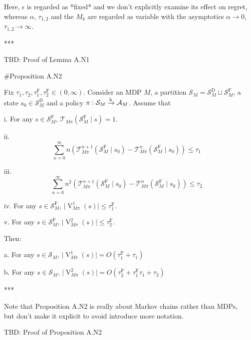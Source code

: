 \documentclass[a4paper]{article}
\newcommand{\AP}[1]{\left(#1\right)}
\newcommand{\Abs}[1]{\lvert #1 \rvert}
\newcommand{\M}{\xrightarrow{\textnormal{k}}}
\newcommand{\A}{\mathcal{A}}
\newcommand{\St}{\mathcal{S}}
\newcommand{\T}{\mathcal{T}}
\newcommand{\SF}{\St^{\text{F}}}
\newcommand{\SD}{\St^{\text{D}}}
\newcommand{\TF}{\tau^{\text{F}}}
\newcommand{\V}{\operatorname{V}}
\begin{document}
Here, $\epsilon$ is regarded as *fixed* and we don't explicitly examine its effect on regret, whereas $\alpha$, $\tau_{1,2}$ and the $M_k$ are regarded as variable with the asymptotics $\alpha \rightarrow 0$, $\tau_{1,2} \rightarrow \infty$.

***

TBD: Proof of Lemma A.N1

\#Proposition A.N2

Fix $\tau_1, \tau_2, \TF_1, \TF_2 \in (0,\infty)$. Consider an MDP $M$, a partition $\St_M = \SD_M \sqcup \SF_M$, a state $s_0 \in \SD_M$ and a policy $\pi: \St_M \M \A_M$. Assume that

i. For any $s \in \SF_M$, $\T_{M\pi}\AP{\SF_M \mid s}=1$.

ii. $$\sum_{n=0}^\infty n \AP{\T_{M\pi}^{n+1}\AP{\SF_M \mid s_0}-\T_{M\pi}^{n}\AP{\SF_M \mid s_0}} \leq \tau_1$$

iii. $$\sum_{n=0}^\infty n^2 \AP{\T_{M\pi}^{n+1}\AP{\SF_M \mid s_0}-\T_{M\pi}^{n}\AP{\SF_M \mid s_0}} \leq \tau_2$$

iv. For any $s \in \SF_M$, $\Abs{\V^1_{M\pi}(s)} \leq \TF_1$.

v. For any $s \in \SF_M$, $\Abs{\V^2_{M\pi}(s)} \leq \TF_2$. 

Then:

a. For any $s \in \St_M$, $\Abs{\V^1_{M\pi}(s)} = O\AP{\TF_1 + \tau_1}$

b. For any $s \in \St_M$, $\Abs{\V^2_{M\pi}(s)} = O\AP{\TF_2 + \TF_1 \tau_1 + \tau_2}$

***

Note that Proposition A.N2 is really about Markov chains rather than MDPs, but don't make it explicit to avoid introduce more notation.

TBD: Proof of Proposition A.N2
\end{document}
